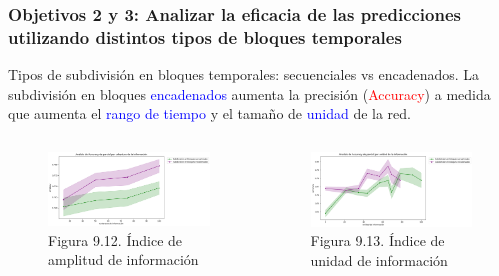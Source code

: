 \documentclass{beamer}
\begin{document}
\begin{frame}
	\frametitle{Objetivos 2 y 3: Analizar la eficacia de las predicciones utilizando distintos tipos de bloques temporales}
	\begin{block}{Tipos de subdivisión en bloques temporales: secuenciales vs encadenados.}
		La subdivisión en bloques \textcolor{blue}{encadenados} aumenta la precisión (\textcolor{red}{Accuracy}) a medida que aumenta el \textcolor{blue}{rango de tiempo} y el tamaño de \textcolor{blue}{unidad} de la red.
	\end{block}
	
	\begin{columns}[c]
	\begin{column}{.5\textwidth}
		\begin{figure}
			\centering
			\includegraphics[width=1\textwidth]{figs/cap7/figura_15}
			\caption{Figura 9.12. Índice de amplitud de información}
		\end{figure}      
	\end{column}
	\begin{column}{.5\textwidth}
		\begin{figure}
			\centering
			\includegraphics[width=1\textwidth]{figs/cap7/figura_16}
			\caption{Figura 9.13. Índice de unidad de información}
		\end{figure}
	\end{column}
\end{columns}

\end{frame}
\end{document}
